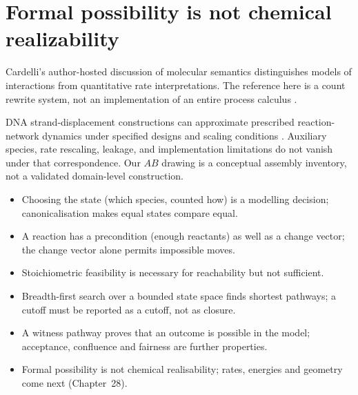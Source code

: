 \section{Formal possibility is not chemical realizability}
Cardelli's author-hosted discussion of molecular semantics distinguishes models
of interactions from quantitative rate interpretations. The reference here is
a count rewrite system, not an implementation of an entire process calculus
\cite{Cardelli2008}.

DNA strand-displacement constructions can approximate prescribed reaction-network
dynamics under specified designs and scaling conditions \cite{Soloveichik2010}.
Auxiliary species, rate rescaling, leakage, and implementation limitations do not
vanish under that correspondence. Our $AB$ drawing is a conceptual assembly
inventory, not a validated domain-level construction.

\begin{KeyIdeas}
\begin{itemize}\setlength{\itemsep}{2pt}
\item Choosing the state (which species, counted how) is a modelling decision;
canonicalisation makes equal states compare equal.
\item A reaction has a precondition (enough reactants) as well as a change
vector; the change vector alone permits impossible moves.
\item Stoichiometric feasibility is necessary for reachability but not
sufficient.
\item Breadth-first search over a bounded state space finds shortest pathways;
a cutoff must be reported as a cutoff, not as closure.
\item A witness pathway proves that an outcome is possible in the model;
acceptance, confluence and fairness are further properties.
\item Formal possibility is not chemical realisability; rates, energies and
geometry come next (Chapter~28).
\end{itemize}
\end{KeyIdeas}


